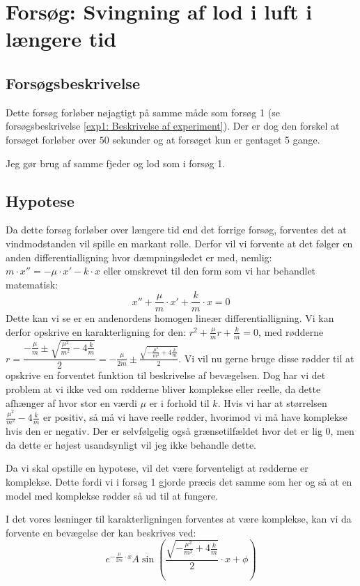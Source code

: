 \section{Forsøg: Svingning af lod i luft i længere tid}

\subsection{Forsøgsbeskrivelse}
Dette forsøg forløber nøjagtigt på samme måde som forsøg 1 (se forsøgsbeskrivelse \ref{exp1: Beskrivelse af experiment}).
Der er dog den forskel at forsøget forløber over $50$ sekunder og at forsøget kun er gentaget 5 gange. 

Jeg gør brug af samme fjeder og lod som i forsøg 1.

\subsection{Hypotese}\label{exp2: Hypotese}
Da dette forsøg forløber over længere tid end det forrige forsøg, forventes det at vindmodstanden vil spille en markant rolle. 
Derfor vil vi forvente at det følger en anden differentialligning hvor dæmpningsledet er med, nemlig:
$m\cdot x''= -\mu \cdot x' - k\cdot x$
eller omskrevet til den form som vi har behandlet matematisk:
$$x''+ \frac{\mu}{m} \cdot x' + \frac{k}{m}\cdot x=0$$
Dette kan vi  se er en andenordens homogen lineær differentialligning.
Vi kan derfor opskrive en karakterligning for den:
$r^2 + \frac{\mu}{m} r + \frac{k}{m} = 0$, med rødderne $r = \dfrac{-\frac{\mu}{m} \pm \sqrt{\frac{\mu^2}{m^2}-4\frac{k}{m}}}{2}=
-\frac{\mu}{2m}  \pm   \frac{\sqrt{-\frac{\mu^2}{m^2}+4\frac{k}{m}}}{2}$.
Vi vil nu gerne bruge disse rødder til at opskrive en forventet funktion til beskrivelse af bevægelsen. 
Dog har vi det problem at vi ikke ved om rødderne bliver komplekse eller reelle, da dette afhænger af hvor stor en værdi $\mu$ er i forhold til $k$.
Hvis vi har at størrelsen $\frac{\mu^2}{m^2}-4\frac{k}{m}$ er positiv, så må vi have reelle rødder, hvorimod vi må have komplekse hvis den er negativ. 
Der er selvfølgelig også grænsetilfældet hvor det er lig $0$, men da dette er højest usandsynligt vil jeg ikke behandle dette. 

Da vi skal opstille en hypotese, vil det være forventeligt at rødderne er komplekse. 
Dette fordi vi i forsøg 1 gjorde præcis det samme som her og så at en model med komplekse rødder så ud til at fungere. 

I det vores løsninger til karakterligningen forventes at være komplekse, kan vi da forvente en bevægelse der kan beskrives ved:
$$e^{-\frac{\mu}{2m} \cdot x}A\sin(\frac{\sqrt{-\frac{\mu^2}{m^2}+4\frac{k}{m}}}{2} \cdot x+\phi)$$
